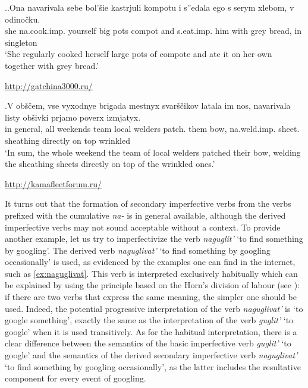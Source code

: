 \ex.\ag.\label{ex:navarivat2}Ona navarivala sebe bol'\v{s}ie kastrjuli kompotu i s''edala ego s serym xlebom, v odino\v{c}ku.\\
she na.cook.imp. yourself big pots compot and s.eat.imp. him with grey bread, in singleton\\
\vspace{0.5em}
`She regularly cooked herself large pots of compote and ate it on her own together with grey bread.'
\begin{flushright}
\vspace{-0.5em}
\url{http://gatchina3000.ru/}
\end{flushright}
\bg.\label{ex:navarivat1}V ob\v{s}\v{c}em, vse vyxodnye brigada mestnyx svar\v{s}\v{c}ikov latala im nos, navarivala listy ob\v{s}ivki prjamo poverx izmjatyx.\\
in general, all weekends team local welders patch. them bow, na.weld.imp. sheet. sheathing directly {on top} wrinkled\\
\vspace{0.5em}
`In sum, the whole weekend the team of local welders patched their bow, welding the sheathing sheets directly on top of the wrinkled ones.'
\begin{flushright}
\vspace{-0.5em}
\url{http://kamafleetforum.ru/}
\end{flushright}

It turns out that the formation of secondary imperfective verbs from the verbs prefixed with the cumulative \textit{na-} is in general available, although the derived imperfective verbs may not sound acceptable without a context. To provide another example, let us try to imperfectivize the verb \textit{naguglit'} `to find something by googling'. The derived verb \textit{naguglivat'} `to find something by googling occasionally' is used, as evidenced by the examples one can find in the internet, such as \ref{ex:naguglivat}. This verb is interpreted exclusively habitually which can be explained by using the principle based on the Horn's division of labour (see \citealt{Horn:84}): if there are two verbs that express the same meaning, the simpler one should be used. Indeed, the potential progressive interpretation of the verb \textit{naguglivat'} is `to google something', exactly the same as the interpretation of the verb \textit{guglit'} `to google' when it is used transitively. As for the habitual interpretation, there is a clear difference between the semantics of the basic imperfective verb \textit{guglit'} `to google' and the semantics of the derived secondary imperfective verb \textit{naguglivat'} `to find something by googling occasionally', as the latter includes the resultative component for every event of googling. 

